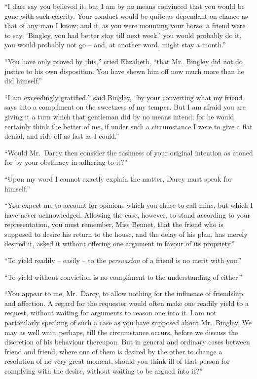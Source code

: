 “I dare say you believed it; but I am by no means
convinced that you would be gone with such celerity.
Your conduct would be quite as dependant on chance as
that of any man I know; and if, as you were mounting
your horse, a friend were to say, ‘Bingley, you had better
stay till next week,’ you would probably do it, you would
probably not go -- and, at another word, might stay a
month.”

“You have only proved by this,” cried Elizabeth,
“that Mr.\ Bingley did not do justice to his own disposition.
You have shewn him off now much more than
he did himself.”

“I am exceedingly gratified,” said Bingley, “by your
converting what my friend says into a compliment on the
sweetness of my temper. But I am afraid you are giving
it a turn which that gentleman did by no means intend;
for he would certainly think the better of me, if under
such a circumstance I were to give a flat denial, and ride
off as fast as I could.”

“Would Mr.\ Darcy then consider the rashness of your
original intention as atoned for by your obstinacy in
adhering to it?”

“Upon my word I cannot exactly explain the matter,
Darcy must speak for himself.”

“You expect me to account for opinions which you
chuse to call mine, but which I have never acknowledged.
Allowing the case, however, to stand according to your
representation, you must remember, Miss Bennet, that the
friend who is supposed to desire his return to the house,
and the delay of his plan, has merely desired it, asked it
without offering one argument in favour of its propriety.”

“To yield readily -- easily -- to the \textit{persuasion} of a friend
is no merit with you.”

“To yield without conviction is no compliment to the
understanding of either.”

“You appear to me, Mr.\ Darcy, to allow nothing for
the influence of friendship and affection. A regard for
the requester would often make one readily yield to a
request, without waiting for arguments to reason one into
it. I am not particularly speaking of such a case as you
have supposed about Mr.\ Bingley. We may as well wait,
perhaps, till the circumstance occurs, before we discuss
the discretion of his behaviour thereupon. But in general
and ordinary cases between friend and friend, where one
of them is desired by the other to change a resolution
of no very great moment, should you think ill of that person
for complying with the desire, without waiting to be
argued into it?”

